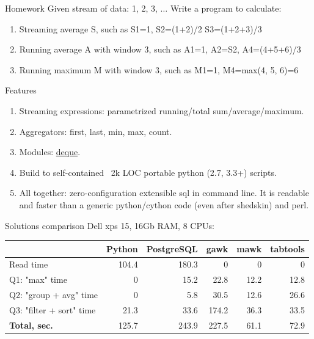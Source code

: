 \documentclass[unicode, notheorems, aspectratio=169]{beamer}
\begin{document}
\begin{frame}{Homework}
Given stream of data: 1, 2, 3, $\dots$ Write a program to calculate:
\begin{enumerate}
\item Streaming average S, such as S1=1, S2=(1+2)/2 S3=(1+2+3)/3
\item Running average A with window 3, such as A1=1, A2=S2, A4=(4+5+6)/3
\item Running maximum M with window 3, such as M1=1, M4=max(4, 5, 6)=6
\end{enumerate}
\end{frame}

\begin{frame}{Features}
\begin{enumerate}
\item Streaming expressions: parametrized running/total sum/average/maximum\footnotemark.
\item Aggregators: first, last, min, max, count.
\item Modules: \href{https://en.wikipedia.org/wiki/Double-ended_queue}{deque}.
\item Build to self-contained ~2k LOC portable python (2.7, 3.3+) scripts.
\item All together: zero-configuration extensible sql in command line. It is readable and faster than a generic python/cython code (even after shedskin) and perl. 
\end{enumerate}

\end{frame}

\begin{frame}{Solutions comparison}
Dell xps 15, 16Gb RAM, 8 CPUs:
\vfill
\begin{tabular}{ |l|r|r|r|r|r| } 
  \hline
  & \textbf{Python} & \textbf{PostgreSQL} & \textbf{gawk} & \textbf{mawk} & \textbf{tabtools} \\ \hline
  Read time & 104.4 & 180.3 & 0 & 0 & 0 \\ \hline
  Q1: "max" time & 0 & 15.2 & 22.8 & 12.2 & 12.8 \\ \hline
  Q2: "group + avg" time & 0 & 5.8 & 30.5 & 12.6 & 26.6\footnotemark \\ \hline
  Q3: "filter + sort" time & 21.3 & 33.6 & 174.2 & 36.3 & 33.5 \\ \hline
  \textbf{Total, sec.} & 125.7 & 243.9 & 227.5 & \alert{61.1} & \alert{72.9} \\ \hline
\end{tabular}
\end{frame}
\end{document}
